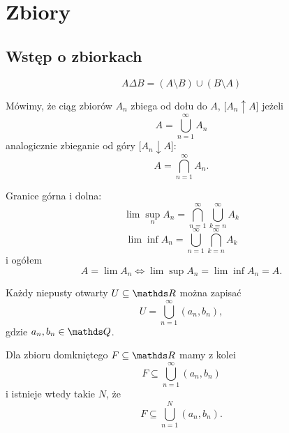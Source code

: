 \section{Zbiory}

\subsection{Wstęp o zbiorkach}

\begin{multicols}{2}
    
$$A\Delta B=(A\setminus B)\cup (B\setminus A)$$

Mówimy, że ciąg zbiorów $A_n$ zbiega od dołu do $A$, [$A_n\uparrow A$] jeżeli
$$A=\bigcup\limits_{n=1}^\infty A_n$$
analogicznie zbieganie od góry [$A_n\downarrow A$]:
$$A=\bigcap\limits_{n=1}^\infty A_n.$$

{\color{def}Granice górna i dolna}:
$$\lim\sup_n A_n=\bigcap\limits_{n=1}^\infty\bigcup\limits_{k=n}^\infty A_k$$
$$\lim\inf A_n=\bigcup\limits_{n=1}^\infty\bigcap\limits_{k=n}^\infty A_k$$
i ogółem
$$A=\lim A_n\iff \lim\sup A_n=\lim\inf A_n=A.$$

\medskip

Każdy niepusty otwarty $U\subseteq \R$ można zapisać
$$U=\bigcup\limits_{n=1}^\infty (a_n,b_n),$$
gdzie $a_n,b_n\in\Q$.
\smallskip

Dla zbioru domkniętego $F\subseteq\R$ mamy z kolei
$$F\subseteq\bigcup\limits_{n=1}^\infty(a_n,b_n)$$
i istnieje wtedy takie $N$, że
$$F\subseteq\bigcup\limits_{n=1}^N(a_n,b_n).$$

\end{multicols}
\bigskip

\bigskip

